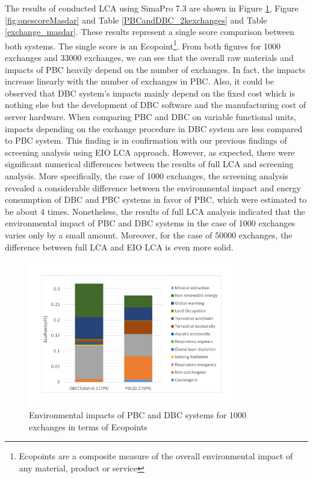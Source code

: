 \documentclass[conference]{IEEEtran}
\begin{document}
The results of conducted LCA using SimaPro 7.3 are shown in Figure \ref{fig:onescore}, Figure \ref{fig:onescoreMasdar} and Table \ref{PBCandDBC_2kexchanges} and Table \ref{exchange_masdar}. These results represent a single score comparison between both systems. The single score is an Ecopoint\footnote{Ecopoints are a composite measure of the overall environmental impact of any material, product or service}. From both figures for 1000 exchanges and 33000 exchanges, we can see that the overall raw materials and impacts of PBC heavily depend on the number of exchanges. In fact, the impacts increase linearly with the number of exchanges in PBC. Also, it could be observed that DBC system's impacts mainly depend on the fixed cost which is nothing else but the development of DBC software and the manufacturing cost of server hardware. When comparing PBC and DBC on variable functional units, impacts depending on the exchange procedure in DBC system are less compared to PBC system.  This finding is in confirmation with our previous findings of screening analysis using EIO LCA approach. However, as expected, there were significant numerical differences between the results of full LCA and screening analysis. More specifically, the case of 1000 exchanges, the screening analysis revealed a considerable difference between the environmental impact and energy consumption of DBC and PBC systems in favor of PBC, which were estimated to be about 4 times. Nonetheless, the results of full LCA analysis indicated that the environmental impact of PBC and DBC systems in the case of 1000 exchanges varies only by a small amount. Moreover, for the case of 50000 exchanges, the difference between full LCA and EIO LCA is even more solid.

\begin{figure}[h]
\centering
\includegraphics[width=9cm]{onescore2K}
\caption{Environmental impacts of PBC and DBC systems for 1000 exchanges in terms of Ecopoints}
\label{fig:onescore}
\end{figure}
\end{document}
